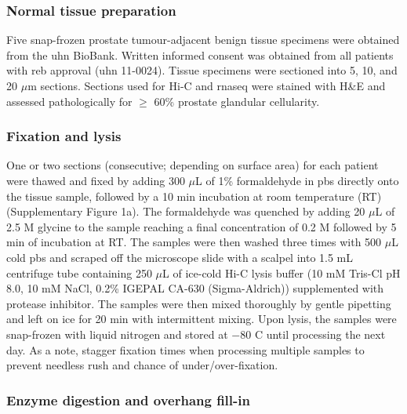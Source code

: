 \subsubsection{Normal tissue preparation}

Five snap-frozen prostate tumour-adjacent benign tissue specimens were obtained from the \gls{uhn} BioBank.
Written informed consent was obtained from all patients with \gls{reb} approval (\gls{uhn} 11-0024).
Tissue specimens were sectioned into 5, 10, and 20 $\mu$m sections.
Sections used for Hi-C and \gls{rnaseq} were stained with H\&E and assessed pathologically for $\ge$ 60\% prostate glandular cellularity.

\subsubsection{Fixation and lysis}

One or two sections (consecutive; depending on surface area) for each patient were thawed and fixed by adding 300 $\mu$L of 1\% formaldehyde in \gls{pbs} directly onto the tissue sample, followed by a 10 min incubation at room temperature (RT) (Supplementary Figure 1a).
The formaldehyde was quenched by adding 20 $\mu$L of 2.5 M glycine to the sample reaching a final concentration of 0.2 M followed by 5 min of incubation at RT.
The samples were then washed three times with 500 $\mu$L cold \gls{pbs} and scraped off the microscope slide with a scalpel into 1.5 mL centrifuge tube containing 250 $\mu$L of ice-cold Hi-C lysis buffer (10 mM Tris-Cl pH 8.0, 10 mM NaCl, 0.2\% IGEPAL CA-630 (Sigma-Aldrich)) supplemented with protease inhibitor.
The samples were then mixed thoroughly by gentle pipetting and left on ice for 20 min with intermittent mixing.
Upon lysis, the samples were snap-frozen with liquid nitrogen and stored at $-80$ \textdegree C until processing the next day.
As a note, stagger fixation times when processing multiple samples to prevent needless rush and chance of under/over-fixation.

\subsubsection{Enzyme digestion and overhang fill-in}

